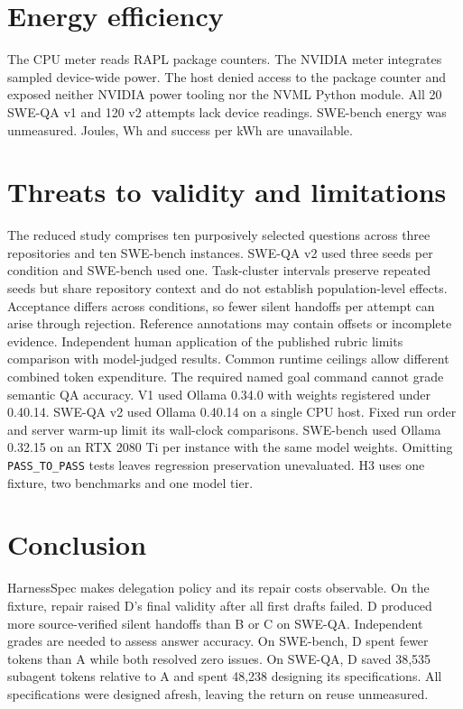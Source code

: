 \documentclass[sigconf,nonacm]{acmart}
\begin{document}
\section{Energy efficiency}
The CPU meter reads RAPL package counters. The NVIDIA meter integrates
sampled device-wide power. The host denied access to the package counter
and exposed neither NVIDIA power tooling nor the NVML Python module.
All 20 SWE-QA v1 and 120 v2 attempts lack device readings. SWE-bench energy was unmeasured. Joules, Wh and success per kWh are unavailable.

\section{Threats to validity and limitations}
The reduced study comprises ten purposively selected questions across
three repositories and ten SWE-bench instances. SWE-QA v2 used three seeds per condition and SWE-bench used one. Task-cluster intervals preserve repeated seeds but
share repository context and do not establish population-level effects.
Acceptance differs across conditions, so fewer silent handoffs per
attempt can arise through rejection. Reference annotations may contain
offsets or incomplete evidence. Independent human application of the
published rubric limits comparison with model-judged results.
Common runtime ceilings allow different combined token expenditure.
The required named goal command cannot grade semantic QA accuracy.
V1 used Ollama 0.34.0 with weights registered under 0.40.14.
SWE-QA v2 used Ollama 0.40.14 on a single CPU host. Fixed run order
and server warm-up limit its wall-clock comparisons. SWE-bench used
Ollama 0.32.15 on an RTX 2080 Ti per instance with the same model
weights. Omitting \texttt{PASS\_TO\_PASS} tests leaves regression
preservation unevaluated. H3 uses one fixture, two benchmarks and one model tier.

\section{Conclusion}
HarnessSpec makes delegation policy and its repair costs observable.
On the fixture, repair raised D's final validity after all first drafts
failed. D produced more source-verified silent handoffs than B or C on
SWE-QA. Independent grades are needed to assess answer accuracy.
On SWE-bench, D spent fewer tokens than A while both resolved zero
issues. On SWE-QA, D saved 38,535 subagent tokens relative to A and
spent 48,238 designing its specifications. All specifications were
designed afresh, leaving the return on reuse unmeasured.
\end{document}
